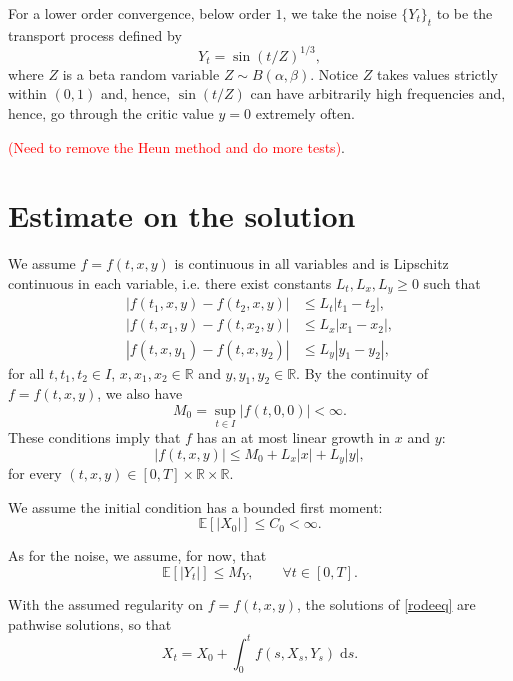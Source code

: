 \documentclass[reqno,12pt]{amsart}
\theoremstyle{plain}%
\theoremstyle{definition}
\begin{document}
For a lower order convergence, below order $1$, we take the noise $\{Y_t\}_t$ to be the transport process defined by
$$
Y_t = \sin(t/Z)^{1/3},
$$
where $Z$ is a beta random variable $Z \sim B(\alpha, \beta)$. Notice $Z$ takes values strictly within $(0, 1)$ and, hence, $\sin(t/Z)$ can have arbitrarily high frequencies and, hence, go through the critic value $y = 0$ extremely often.

\textcolor{red}{(Need to remove the Heun method and do more tests)}.

\section{Estimate on the solution}

We assume $f=f(t, x, y)$ is continuous in all variables and is Lipschitz continuous in each variable, i.e. there exist constants $L_t, L_x, L_y \geq 0$ such that
\begin{align}
  |f(t_1, x, y) - f(t_2, x, y)| & \leq L_t |t_1-t_2|, \\
  |f(t, x_1, y) - f(t, x_2, y)| & \leq L_x |x_1 - x_2|, \\
  |f(t, x, y_1) - f(t, x, y_2)| & \leq L_y |y_1 - y_2|,
\end{align}
for all $t, t_1, t_2 \in I$, $x, x_1, x_2 \in \mathbb{R}$ and $y, y_1, y_2\in \mathbb{R}$. By the continuity of $f=f(t, x, y)$, we also have
$$
M_0 = \sup_{t\in I} |f(t, 0, 0)| < \infty.
$$
These conditions imply that $f$ has an at most linear growth in $x$ and $y$:
\begin{equation}
    \label{Mfestimate}
    |f(t, x, y)| \leq M_0 + L_x|x| + L_y|y|,
\end{equation}
for every $(t, x, y) \in [0, T] \times \mathbb{R} \times \mathbb{R}$.

We assume the initial condition has a bounded first moment:
\begin{equation}
    \label{EX0assumption}
    \mathbb{E}[|X_0|] \leq C_0 < \infty.
\end{equation}

As for the noise, we assume, for now, that
\begin{equation}
    \label{EYtassumption}
    \mathbb{E}[|Y_t|] \leq M_Y, \qquad \forall t\in [0, T].
\end{equation}

With the assumed regularity on $f=f(t, x, y)$, the solutions of \eqref{rodeeq} are pathwise solutions, so that
$$
X_t = X_0 + \int_0^t f(s, X_s, Y_s) \;\mathrm{d}s.
$$
\end{document}
